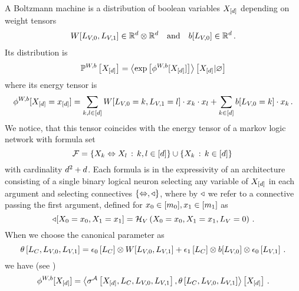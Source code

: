 A Boltzmann machine is a distribution of boolean variables $X_{[d]}$ depending on weight tensors %
\begin{align*}
    W[L_{V,0},L_{V,1}] \in\mathbb{R}^{d}\otimes\mathbb{R}^{d} \quad \text{and} \quad b[L_{V,0}] \in\mathbb{R}^{d} \, .
\end{align*}
Its distribution is
\begin{align*}
    \mathbb{P}^{W,b}\left[X_{[d]}\right] = \left\langle \mathrm{exp}\left[\phi^{W,b}[X_{[d]}]\right]\right\rangle \left[ X_{[d]} | \varnothing \right]
\end{align*}
where its energy tensor is
\[ \phi^{W,b}[X_{[d]}=x_{[d]}] =
\sum_{k,l \in [d]}
W[L_{V,0}=k, L_{V,1}=l] \cdot x_{k} \cdot x_{l}
+ \sum_{k\in[d]} b[L_{V,0}=k] \cdot x_{k}\, . \]
We notice, that this tensor coincides with the energy tensor of a markov logic network with formula set
\[ \mathcal{F} = \{ X_{k} \Leftrightarrow X_{l} \, : \, k,l \in[d] \}
\cup \{ X_{k}\, : \, k\in[d] \} \, \]
with cardinality $d^2+d$.
Each formula is in the expressivity of an architecture consisting of a single binary logical neuron selecting any variable of $X_{[d]}$ in each argument and selecting connectives $\{\Leftrightarrow,\triangleleft\}$, where by $\triangleleft$ we refer to a connective passing the first argument, defined for $x_{0}\in[m_{0}], x_{1}\in[m_{1}]$ as
\[ \triangleleft[X_{0}=x_{0},X_{1}=x_{1}] = \mathcal{H}_{V}\left(X_{0}=x_{0},X_{1}=x_{1},L_{V}=0\right) \, . \]
When we choose the canonical parameter as
\[ \theta\left[L_{C},L_{V,0},L_{V,1}\right]
= \epsilon_{0}\left[L_{C}\right] \otimes W[L_{V,0},L_{V,1}]
+ \epsilon_{1}\left[L_{C}\right] \otimes b[L_{V,0}] \otimes  \epsilon_{0}\left[L_{V,1}\right] \, .
\]
we have (see )
\[ \phi^{W,b}[X_{[d]}] =
\left\langle \sigma^{\mathcal{A}}\left[X_{[d]},L_{C},L_{V,0},L_{V,1}\right],
    \theta\left[L_{C},L_{V,0},L_{V,1}\right]\right\rangle \left[ X_{[d]} \right] \, . \]


